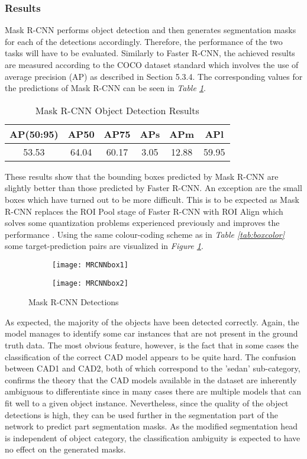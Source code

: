 \documentclass[main.tex]{subfiles}
\begin{document}
\subsubsection{Results}
Mask R-CNN performs object detection and then generates segmentation masks for each of the detections accordingly. Therefore, the performance of the two tasks will have to be evaluated. Similarly to Faster R-CNN, the achieved results are measured according to the COCO dataset standard which involves the use of average precision (AP) as described in Section 5.3.4. The corresponding values for the predictions of Mask R-CNN can be seen in \emph{Table \ref{tab:mrcnn_obj_results}}. 
\begin{table}[H]
	\centering
	\begin{tabular}{| c | c | c | c | c | c |}
		\hline 
  		AP(50:95) & AP50 & AP75 & APs & APm & APl  \\
  		\hline
   		53.53 & 64.04 & 60.17 & 3.05 & 12.88 & 59.95 \\
		\hline
	\end{tabular}	
\caption{Mask R-CNN Object Detection Results}
\label{tab:mrcnn_obj_results}
\end{table}
\indent These results show that the bounding boxes predicted by Mask R-CNN are slightly better than those predicted by Faster R-CNN. An exception are the small boxes which have turned out to be more difficult. This is to be expected as Mask R-CNN replaces the ROI Pool stage of Faster R-CNN with ROI Align which solves some quantization problems experienced previously and improves the performance \cite{He2017}. Using the same colour-coding scheme as in \emph{Table \ref{tab:boxcolor}} some target-prediction pairs are visualized in \emph{Figure \ref{fig:mrcnn_bbox}}.
\begin{figure}[H]
\centering
\begin{subfigure}[c]{0.5\textwidth}
\centering
\texttt{[image: MRCNNbox1]}
\end{subfigure}%
\begin{subfigure}[c]{0.53\textwidth}
\centering
\texttt{[image: MRCNNbox2]}
\end{subfigure}%
\caption{Mask R-CNN Detections}
\label{fig:mrcnn_bbox}
\end{figure}
As expected, the majority of the objects have been detected correctly. Again, the model manages to identify some car instances that are not present in the ground truth data. The most obvious feature, however, is the fact that in some cases the classification of the correct CAD model appears to be quite hard. The confusion between CAD1 and CAD2, both of which correspond to the 'sedan' sub-category, confirms the theory that the CAD models available in the dataset are inherently ambiguous to differentiate since in many cases there are multiple models that can fit well to a given object instance. Nevertheless, since the quality of the object detections is high, they can be used further in the segmentation part of the network to predict part segmentation masks. As the modified segmentation head is independent of object category, the classification ambiguity is expected to have no effect on the generated masks.\\
\end{document}
